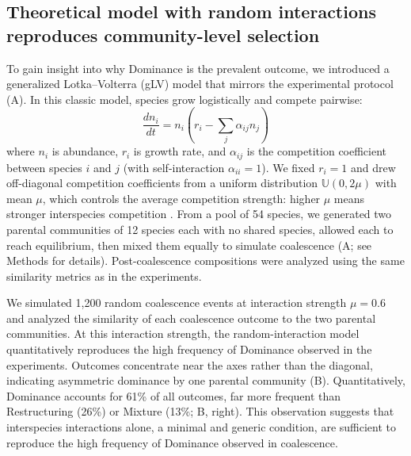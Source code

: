 \subsection{Theoretical model with random interactions reproduces community-level selection}
\label{sec:results:glv_model}
To gain insight into why Dominance is the prevalent outcome, we introduced a generalized Lotka--Volterra (gLV) model \citep{May1972, Grilli2017} that mirrors the experimental protocol (A). In this classic model, species grow logistically and compete pairwise:
\begin{equation}
\frac{dn_i}{dt} = n_i \left( r_i - \sum_j \alpha_{ij} n_j \right)
\label{eq:glv}
\end{equation}
where $n_i$ is abundance, $r_i$ is growth rate, and $\alpha_{ij}$ is the competition coefficient between species $i$ and $j$ (with self-interaction $\alpha_{ii} = 1$). We fixed $r_i = 1$ and drew off-diagonal competition coefficients from a uniform distribution $\mathbb{U}(0, 2\mu)$ with mean $\mu$, which controls the average competition strength: higher $\mu$ means stronger interspecies competition \citep{Hu2022,Hu2025}. From a pool of 54 species, we generated two parental communities of 12 species each with no shared species, allowed each to reach equilibrium, then mixed them equally to simulate coalescence (A; see Methods for details). Post-coalescence compositions were analyzed using the same similarity metrics as in the experiments.

We simulated 1,200 random coalescence events at interaction strength $\mu = 0.6$ and analyzed the similarity of each coalescence outcome to the two parental communities. At this interaction strength, the random-interaction model quantitatively reproduces the high frequency of Dominance observed in the experiments. Outcomes concentrate near the axes rather than the diagonal, indicating asymmetric dominance by one parental community (B). Quantitatively, Dominance accounts for 61\% of all outcomes, far more frequent than Restructuring (26\%) or Mixture (13\%; B, right). This observation suggests that interspecies interactions alone, a minimal and generic condition, are sufficient to reproduce the high frequency of Dominance observed in coalescence.

